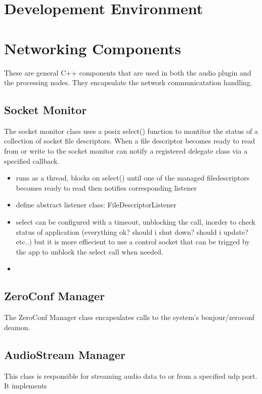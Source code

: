 \section{Developement Environment}

\section{Networking Components}

These are general C++ components that are used in both the audio plugin and the processing nodes. They encapsulate the network communicatation handling.

\subsection{Socket Monitor}

The socket monitor class uses a posix select() function to montitor the status of a collection of socket file descriptors. When a file descriptor becomes ready to read from or write to the socket monitor can notify a registered delegate class via a specified callback.

\begin{itemize}

\item runs as a thread, blocks on select() until one of the managed filedescriptors becomes ready to read then notifies corresponding listener

\item define abstract listener class: FileDescriptorListener
\item select can be configured with a timeout, unblocking the call, inorder to check status of application (everything ok? should i shut down? should i update? etc..) but it is more effiecient to use a control socket that can be trigged by the app to unblock the select call when needed.
\item


\end{itemize}

\subsection{ZeroConf Manager}

The ZeroConf Manager class encapsulates calls to the system's bonjour/zeroconf deamon.

\subsection{AudioStream Manager}

This class is responsible for streaming audio data to or from a specified udp port. It implements